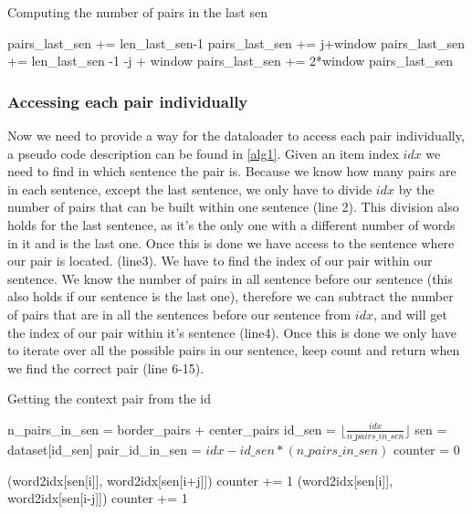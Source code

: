 \begin{algorithm}[h]
\caption{Computing the number of pairs in the last sen}
\label{alg2}
\begin{algorithmic}[1]
\STATE pairs\_last\_sen += len\_last\_sen-1
\ELSE
\STATE pairs\_last\_sen += j+window
\ENDIF
{}
\STATE pairs\_last\_sen += len\_last\_sen -1 -j + window
\ELSE
\STATE pairs\_last\_sen += 2*window
\ENDIF
\ENDFOR
\RETURN pairs\_last\_sen
\end{algorithmic}
\end{algorithm}

 \subsubsection{Accessing each pair individually}
Now we need to provide a way for the dataloader to access each pair individually, a pseudo code description can be found in \ref{alg1}. 
Given an item index $idx$ we
 need to find in which sentence the pair is. Because we know how many pairs  are in each sentence, except the last sentence, we only have to divide $idx$ by the number of pairs that can be built within one sentence (line 2). This division also holds for the last sentence, as it's the only one with a different number of words in it and is the last one.  Once this is done we have access to the sentence where our pair is located. (line3). We have to find the index of our pair within our sentence. We know the number of pairs in all sentence before our sentence (this also holds if our sentence is the last one), therefore we can subtract the number of pairs that are in all the sentences before our sentence from $idx$, and will get the index of our pair within it's sentence (line4). Once this is done we only have to iterate over all the possible pairs in our sentence, keep count and return when we find the correct pair (line 6-15).
\begin{algorithm}
\caption{Getting the context pair from the id}
\label{alg1}
\begin{algorithmic}[1]

\STATE n\_pairs\_in\_sen = border\_pairs + center\_pairs
 \STATE id\_sen = $\lfloor \frac{idx}{n\_pairs\_in\_sen} \rfloor$
\STATE  sen  = dataset[id\_sen]
\STATE  pair\_id\_in\_sen = $idx - id\_sen*(n\_pairs\_in\_sen)$
\STATE counter = 0

\RETURN (word2idx[sen[i]], word2idx[sen[i+j]])
\ENDIF
\STATE counter += 1
\ENDIF
{}
\RETURN (word2idx[sen[i]], word2idx[sen[i-j]])
\ENDIF
\STATE counter += 1
\ENDIF
\ENDFOR
\ENDFOR
\end{algorithmic}
\end{algorithm}

